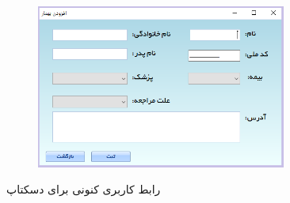 \documentclass[a4paper,12pt]{report}
\begin{document}
\begin{figure}[!h]
\begin{subfigure}[t]{0.6\linewidth}
			\includegraphics[width=0.9\textwidth]{UI/Desktop_UI_7.PNG}
		\end{subfigure}
		\label{fig1:sec2:chap3}
		\caption{
			رابط کاربری کنونی برای دسکتاپ
		}
	\end{figure}
	
\end{document}
